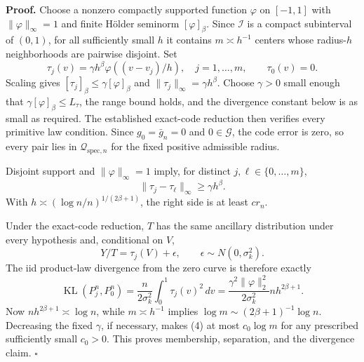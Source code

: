 \textbf{Proof.}
Choose a nonzero compactly supported function \(\varphi\) on \([-1,1]\) with \(\|\varphi\|_\infty=1\) and finite H\"older seminorm \([\varphi]_\beta\).  Since \(\mathcal I\) is a compact subinterval of \((0,1)\), for all sufficiently small \(h\) it contains \(m\asymp h^{-1}\) centers whose radius-\(h\) neighborhoods are pairwise disjoint.  Set
\[
 \tau_j(v)=\gamma h^\beta\varphi((v-v_j)/h),\quad j=1,\ldots,m,
 \qquad \tau_0(v)=0. \tag{1}
\]
Scaling gives \([\tau_j]_\beta\le\gamma[\varphi]_\beta\) and \(\|\tau_j\|_\infty=\gamma h^\beta\).  Choose \(\gamma>0\) small enough that \(\gamma[\varphi]_\beta\le L_\tau\), the range bound holds, and the divergence constant below is as small as required.  The established exact-code reduction then verifies every primitive law condition.  Since \(g_0=\bar g_n=0\) and \(0\in\mathcal G\), the code error is zero, so every pair lies in \(\mathcal Q_{\mathrm{spec},n}\) for the fixed positive admissible radius.

Disjoint support and \(\|\varphi\|_\infty=1\) imply, for distinct \(j,\ell\in\{0,\ldots,m\}\),
\[
 \|\tau_j-\tau_\ell\|_\infty\ge\gamma h^\beta. \tag{2}
\]
With \(h\asymp(\log n/n)^{1/(2\beta+1)}\), the right side is at least \(c r_n\).

Under the exact-code reduction, \(T\) has the same ancillary distribution under every hypothesis and, conditional on \(V\),
\[
 Y/T=\tau_j(V)+\epsilon,\qquad \epsilon\sim N(0,\sigma_k^2). \tag{3}
\]
The iid product-law divergence from the zero curve is therefore exactly
\[
 \operatorname{KL}(P_j^n,P_0^n)
 =\frac{n}{2\sigma_k^2}\int_0^1\tau_j(v)^2\,dv
 =\frac{\gamma^2\|\varphi\|_2^2}{2\sigma_k^2}nh^{2\beta+1}. \tag{4}
\]
Now \(nh^{2\beta+1}\asymp\log n\), while \(m\asymp h^{-1}\) implies \(\log m\sim(2\beta+1)^{-1}\log n\).  Decreasing the fixed \(\gamma\), if necessary, makes (4) at most \(c_0\log m\) for any prescribed sufficiently small \(c_0>0\).  This proves membership, separation, and the divergence claim. \(\square\)